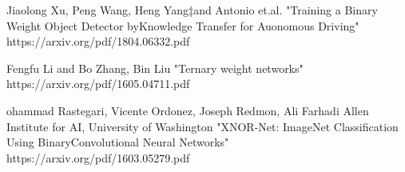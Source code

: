 \documentclass[twocolumn]{article}
\begin{document}
\begin{thebibliography}{99}
 \item Jiaolong Xu, Peng Wang, Heng Yang‡and Antonio et.al.
 "Training a Binary Weight Object Detector byKnowledge Transfer for Auonomous Driving" https://arxiv.org/pdf/1804.06332.pdf
 \item Fengfu Li and Bo Zhang, Bin Liu "Ternary weight networks" https://arxiv.org/pdf/1605.04711.pdf
 \item ohammad Rastegari, Vicente Ordonez, Joseph Redmon, Ali Farhadi Allen Institute for AI, University of Washington
 "XNOR-Net: ImageNet Classification Using BinaryConvolutional Neural Networks" https://arxiv.org/pdf/1603.05279.pdf

\end{thebibliography}
\end{document}
